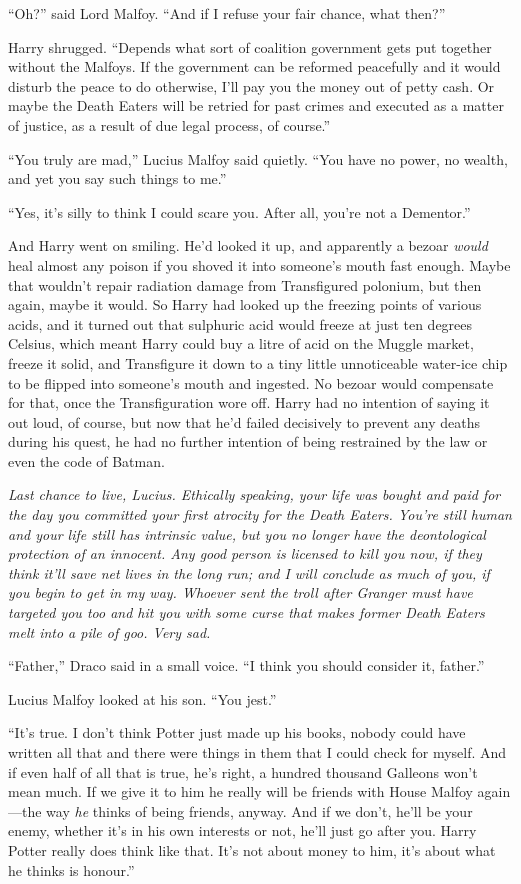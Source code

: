 “Oh?” said Lord Malfoy. “And if I refuse your fair chance, what then?”

Harry shrugged. “Depends what sort of coalition government gets put together without the Malfoys. If the government can be reformed peacefully and it would disturb the peace to do otherwise, I’ll pay you the money out of petty cash. Or maybe the Death Eaters will be retried for past crimes and executed as a matter of justice, as a result of due legal process, of course.”

“You truly are mad,” Lucius Malfoy said quietly. “You have no power, no wealth, and yet you say such things to me.”

“Yes, it’s silly to think I could scare you. After all, you’re not a Dementor.”

And Harry went on smiling. He’d looked it up, and apparently a bezoar \emph{would} heal almost any poison if you shoved it into someone’s mouth fast enough. Maybe that wouldn’t repair radiation damage from Transfigured polonium, but then again, maybe it would. So Harry had looked up the freezing points of various acids, and it turned out that sulphuric acid would freeze at just ten degrees Celsius, which meant Harry could buy a litre of acid on the Muggle market, freeze it solid, and Transfigure it down to a tiny little unnoticeable water-ice chip to be flipped into someone’s mouth and ingested. No bezoar would compensate for that, once the Transfiguration wore off. Harry had no intention of saying it out loud, of course, but now that he’d failed decisively to prevent any deaths during his quest, he had no further intention of being restrained by the law or even the code of Batman.

\emph{Last chance to live, Lucius. Ethically speaking, your life was bought and paid for the day you committed your first atrocity for the Death Eaters. You’re still human and your life still has intrinsic value, but you no longer have the deontological protection of an innocent. Any good person is licensed to kill you now, if they think it’ll save net lives in the long run; and I will conclude as much of you, if you begin to get in my way. Whoever sent the troll after Granger must have targeted you too and hit you with some curse that makes former Death Eaters melt into a pile of goo. Very sad.}

“Father,” Draco said in a small voice. “I think you should consider it, father.”

Lucius Malfoy looked at his son. “You jest.”

“It’s true. I don’t think Potter just made up his books, nobody could have written all that and there were things in them that I could check for myself. And if even half of all that is true, he’s right, a hundred thousand Galleons won’t mean much. If we give it to him he really will be friends with House Malfoy again—the way \emph{he} thinks of being friends, anyway. And if we don’t, he’ll be your enemy, whether it’s in his own interests or not, he’ll just go after you. Harry Potter really does think like that. It’s not about money to him, it’s about what he thinks is honour.”

